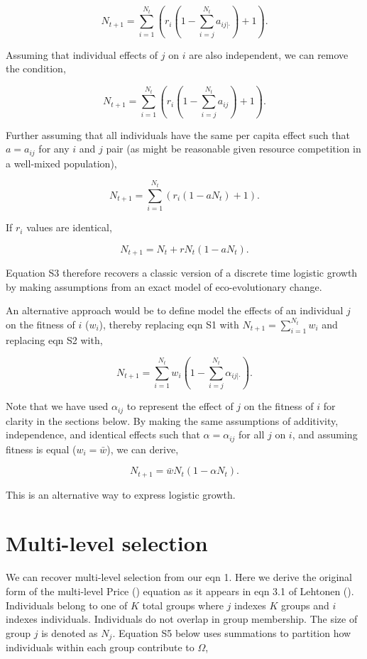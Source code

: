 \documentclass[
]{article}
\begin{document}
\[N_{t+1} = \sum_{i=1}^{N_{t}}\left(r_{i}\left(1 - \sum_{i = j}^{N_{t}}a_{ij|\cdot} \right) + 1\right).
\tag{S2}
\]

Assuming that individual effects of \(j\) on \(i\) are also independent,
we can remove the condition,

\[N_{t+1} = \sum_{i=1}^{N_{t}}\left(r_{i}\left(1 - \sum_{i = j}^{N_{t}}a_{ij} \right) + 1\right).\]

Further assuming that all individuals have the same per capita effect
such that \(a = a_{ij}\) for any \(i\) and \(j\) pair (as might be
reasonable given resource competition in a well-mixed population),

\[N_{t+1} = \sum_{i=1}^{N_{t}}\left(r_{i}\left(1 - a N_{t} \right) + 1\right).\]

If \(r_{i}\) values are identical,

\[N_{t+1} = N_{t} + r N_{t}\left(1 - a N_{t} \right).
\tag{S3}
\]

Equation S3 therefore recovers a classic version of a discrete time
logistic growth by making assumptions from an exact model of
eco-evolutionary change.

An alternative approach would be to define model the effects of an
individual \(j\) on the fitness of \(i\) (\(w_{i}\)), thereby replacing
eqn S1 with \(N_{t+1} = \sum_{i=1}^{N_{t}}w_{i}\) and replacing eqn S2
with,

\[N_{t+1} = \sum_{i=1}^{N_{t}}w_{i}\left(1 - \sum_{i = j}^{N_{t}}\alpha_{ij|\cdot} \right).
\]

Note that we have used \(\alpha_{ij}\) to represent the effect of \(j\)
on the fitness of \(i\) for clarity in the sections below. By making the
same assumptions of additivity, independence, and identical effects such
that \(\alpha = \alpha_{ij}\) for all \(j\) on \(i\), and assuming
fitness is equal (\(w_{i} = \bar{w}\)), we can derive,

\[N_{t+1} = \bar{w}N_{t}(1 - \alpha N_{t}).
\tag{S4}
\]

This is an alternative way to express logistic growth.

\section{Multi-level selection}\label{multi-level-selection}

We can recover multi-level selection from our eqn 1. Here we derive the
original form of the multi-level Price ()
equation as it appears in eqn 3.1 of Lehtonen
(). Individuals belong to one of \(K\)
total groups where \(j\) indexes \(K\) groups and \(i\) indexes
individuals. Individuals do not overlap in group membership. The size of
group \(j\) is denoted as \(N_{j}\). Equation S5 below uses summations
to partition how individuals within each group contribute to \(\Omega\),
\end{document}
